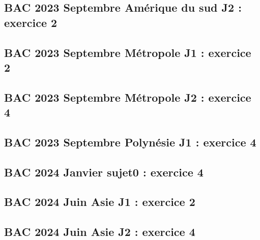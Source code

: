 \documentclass[lang=fr,edition=teacher,layout=sheet]{mxbook}
\begin{document}
\begingroup\endgroup
\par\bigskip
{}\subsection*{BAC 2023 Septembre Amérique du sud J2 : exercice 2}
\begingroup\endgroup
\par\bigskip
{}\subsection*{BAC 2023 Septembre Métropole J1 : exercice 2}
\begingroup\endgroup
\par\bigskip
{}\subsection*{BAC 2023 Septembre Métropole J2 : exercice 4}
\begingroup\endgroup
\par\bigskip
{}\subsection*{BAC 2023 Septembre Polynésie J1 : exercice 4}
\begingroup\endgroup
\par\bigskip
{}\subsection*{BAC 2024 Janvier sujet0 : exercice 4}
\begingroup\endgroup
\par\bigskip
{}\subsection*{BAC 2024 Juin Asie J1 : exercice 2}
\begingroup\endgroup
\par\bigskip
{}\subsection*{BAC 2024 Juin Asie J2 : exercice 4}
\end{document}
